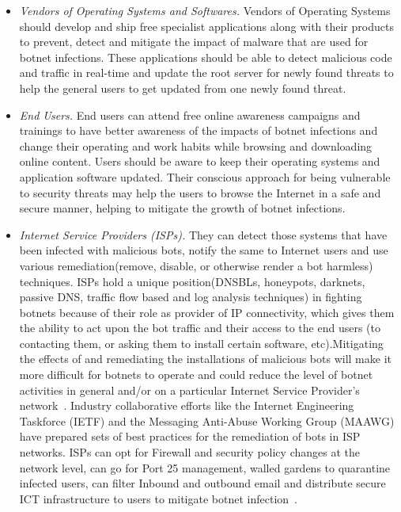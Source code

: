 \label{cap:sec1}
\begin{itemize}
\item \textit{Vendors of Operating Systems and Softwares.} Vendors of Operating Systems should develop and ship free specialist applications along with their products to prevent, detect and mitigate the impact of malware that are used for botnet infections. These applications should be able to detect malicious code and traffic in real-time and update the root server for newly found threats to help the general users to get updated from one newly found threat.
\item \textit{End Users.} End users can attend free online awareness campaigns and trainings to have better awareness of the impacts of botnet infections and change their operating and work habits while browsing and downloading online content. Users should be aware to keep their operating systems and application software updated. Their conscious approach for being vulnerable to security threats may help the users to browse the Internet in a safe and secure manner, helping to mitigate the growth of botnet infections.




\item \textit{Internet Service Providers (ISPs).}  They can detect those systems that have been infected with malicious bots, notify the same to Internet users and use various remediation(remove, disable, or otherwise render a bot harmless) techniques. ISPs hold a unique position(DNSBLs, honeypots, darknets, passive DNS, traffic flow based and log analysis techniques) in fighting botnets because of  their role as provider of IP connectivity, which gives them the ability to act upon the bot traffic and their access to the end users (to contacting them, or asking them to install certain software, etc).Mitigating the effects of and remediating the installations of malicious bots will make it more difficult for botnets to operate and could reduce the level of botnet activities in general and/or on a particular Internet Service Provider's network~\cite{anderson2013measuring}. Industry collaborative efforts like the Internet Engineering Taskforce (IETF) and the Messaging Anti-Abuse Working Group (MAAWG) have prepared sets of best practices for the remediation of bots in ISP networks. ISPs can opt for Firewall and security policy changes at the network level, can go for Port 25 management, walled gardens to quarantine infected users, can filter Inbound and outbound email and distribute secure ICT infrastructure to users to mitigate botnet infection~\cite{charney2012collective}.



\end{itemize}
